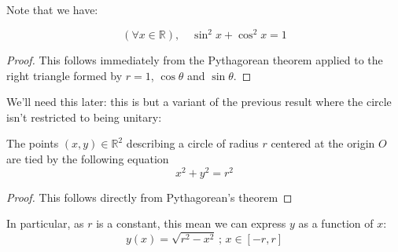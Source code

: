 \documentclass[solutions.tex]{subfiles}
\begin{document}
\begin{figure}[H]
	\centering
\end{figure}
Note that we have:
\begin{theorem}
\[
	(\forall x \in \mathbb{R}),\quad \boxed{\sin^2 x + \cos^2 x = 1}
\]
\end{theorem}
\begin{proof} This follows immediately from the Pythagorean theorem applied
to the right triangle formed by $r=1$, $\cos\theta$ and $\sin\theta$.
\end{proof}


We'll need this later: this is but a variant of the previous
result where the circle isn't restricted to being unitary:

\begin{theorem}
The points $(x, y) \in \mathbb{R}^2$ describing a circle
of radius $r$ centered at the origin $O$ are tied by the
following equation
\[
	\boxed{x^2 + y^2 = r^2 }
\]
\end{theorem}
\begin{proof}
This follows directly from Pythagorean's theorem
\end{proof}

\begin{remark}\label{L02E02:rmk:circle-eq}
In particular, as $r$ is a constant, this mean we can express $y$
as a function of $x$:
\[
	\boxed{y(x) = \sqrt{r^2-x^2}}\,;\,x\in[-r, r]
\]
\end{remark}
\end{document}
